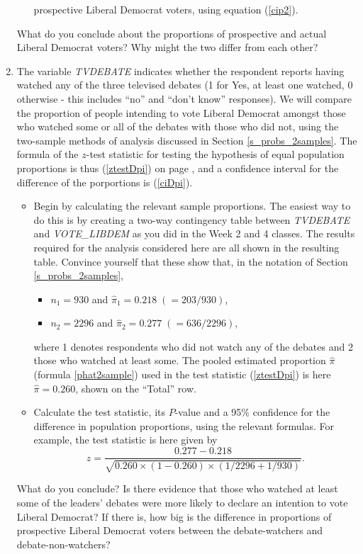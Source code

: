 \begin{enumerate}
\begin{itemize}
prospective Liberal Democrat voters, using equation
(\ref{cip2}).
\end{itemize}
What do you conclude about the
proportions of prospective and actual Liberal Democrat voters? Why might the two
differ from each other?
\item
The variable
\emph{TVDEBATE} indicates  whether the respondent reports having
 watched any of the three televised debates (1 for Yes, at least one watched,
0 otherwise - this includes ``no'' and ``don't know'' responses). We will compare the
proportion of people intending to vote Liberal Democrat amongst those who
watched some or all of the debates with those who did not, using the two-sample methods of
analysis discussed in Section \ref{s_probs_2samples}. The formula of the
$z$-test statistic for testing the hypothesis of equal population
proportions is thus (\ref{ztestDpi}) on page \pageref{ztestDpi}, and a
confidence interval for the difference of the porportions is
(\ref{ciDpi}).
\begin{itemize}
\item
Begin by calculating the relevant
sample proportions. The easiest way to do this is by creating a
two-way contingency table between \emph{TVDEBATE} and
\emph{VOTE\_LIBDEM} as you did in the Week 2 and 4 classes. The results required for the analysis
considered here are all shown in the resulting table. Convince yourself
that these show that, in the notation of Section \ref{s_probs_2samples},
\begin{itemize}
\item
$n_{1}=930$ and $\hat{\pi}_{1}=0.218\; (=203/930)$,
\item
$n_{2}=2296$ and $\hat{\pi}_{2}=0.277\; (=636/2296)$,
\end{itemize}
where 1 denotes respondents who did not watch any of the
debates and 2 those who watched at least some.
The pooled estimated proportion $\hat{\pi}$ (formula
\ref{phat2sample}) used in the test statistic (\ref{ztestDpi}) is here
$\hat{\pi}=0.260$, shown on the ``Total'' row.
\item Calculate the test
statistic, its $P$-value and a 95\%  confidence for the difference in
population proportions, using the relevant formulas. For example, the
test statistic is here given by
\[
z= \frac{0.277-0.218}{\sqrt{0.260\times (1-0.260)\times
(1/2296+1/930)}}.
\]
\end{itemize}
What do you conclude? Is there evidence that those who watched at least
some of the leaders' debates were more likely to declare an intention to
vote Liberal Democrat? If there is,
how big is the difference in proportions of prospective Liberal Democrat
voters between the debate-watchers and debate-non-watchers? \end{enumerate}

